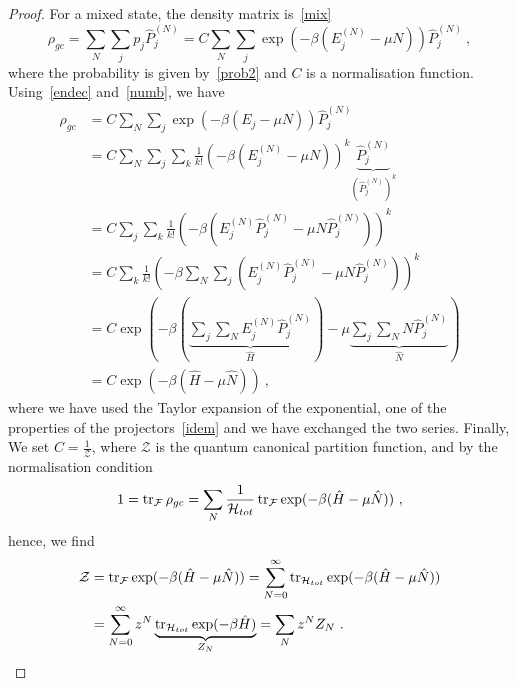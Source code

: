     \begin{proof}
        For a mixed state, the density matrix is~\eqref{mix}
        \begin{equation*}
            \rho_{gc} = \sum_N \sum_j p_j \hat P_j^{(N)} = C \sum_N \sum_j \exp(- \beta (E_j^{(N)} - \mu N)) \hat P_j^{(N)} ~,
        \end{equation*}
        where the probability is given by~\eqref{prob2} and $C$ is a normalisation function.
        Using~\eqref{endec} and~\eqref{numb}, we have
        \begin{equation*}
        \begin{aligned}
            \rho_{gc} & = C \sum_N \sum_j \exp(- \beta (E_j - \mu N)) \hat P_j^{(N)} \\ & = C \sum_N \sum_j \sum_k \frac{1}{k!} (-\beta (E_j^{(N)} - \mu N))^k \underbrace{\hat P_j^{(N)}}_{(\hat P_j^{(N)})^k} \\ & = C \sum_j \sum_k \frac{1}{k!} (-\beta (E_j^{(N)} \hat P_j^{(N)} - \mu N \hat P_j^{(N)}))^k \\ & = C \sum_k \frac{1}{k!} (-\beta \sum_N \sum_j (E_j^{(N)} \hat P_j^{(N)} - \mu N \hat P_j^{(N)}))^k \\ & = C \exp(- \beta (\underbrace{\sum_j \sum_N E_j^{(N)} \hat P_j^{(N)}}_{\hat H}) - \mu \underbrace{\sum_j \sum_N N \hat P_j^{(N)}}_{\hat N}) \\ & = C \exp(- \beta (\hat H - \mu \hat N)) ~,
        \end{aligned}
        \end{equation*}
        where we have used the Taylor expansion of the exponential, one of the properties of the projectors~\eqref{idem} and we have exchanged the two series. Finally, We set $C = \frac{1}{\mathcal Z}$, where $\mathcal Z$ is the quantum canonical partition function, and by the normalisation condition 
        \begin{equation*}
            1 = \operatorname{tr}_{\mathcal F} \rho_{gc} = \sum_N \frac{1}{\mathcal H_{tot}} \operatorname{tr}_{\mathcal F} \exp(- \beta (\hat H - \mu \hat N)) ~,
        \end{equation*}
        hence, we find
        \begin{equation*}
        \begin{aligned}
            \mathcal Z & = \operatorname{tr}_{\mathcal F} \exp(- \beta (\hat H - \mu \hat N)) = \sum_{N=0}^{\infty} \operatorname{tr}_{\mathcal H_{tot}} \exp(- \beta (\hat H - \mu \hat N)) \\ & = \sum_{N=0}^{\infty} z^N \underbrace{\operatorname{tr}_{\mathcal H_{tot}} \exp(- \beta \hat H)}_{Z_N} = \sum_N z^N Z_N ~.
        \end{aligned}
        \end{equation*}
    \end{proof}


